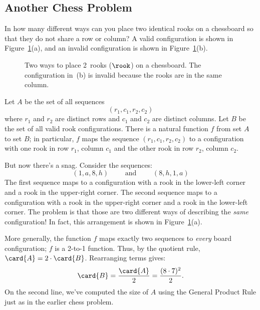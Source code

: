 \subsection{Another Chess Problem}

In how many different ways can you place two identical rooks on a
chessboard so that they do not share a row or column?  A valid
configuration is shown in Figure~\ref{fig:11Q8}(a), and an invalid
configuration is shown in Figure~\ref{fig:11Q8}(b).

\begin{figure}\normalbaselines

\subfloat[valid]{\chessboard[setpieces={ra1, rh8}]}
\subfloat[invalid]{\chessboard[setpieces={rd1, rd6}]}

\caption{Two ways to place 2~rooks ($\rook$) on a chessboard.  The
  configuration in~(b) is invalid because the rooks are in the same
  column.}

\label{fig:11Q8}

\end{figure}

Let $A$ be the set of all sequences
%
\[
(r_1, c_1, r_2, c_2)
\]
%
where $r_1$ and $r_2$ are distinct rows and $c_1$ and $c_2$ are
distinct columns.  Let $B$ be the set of all valid rook
configurations.  There is a natural function $f$ from set $A$ to set
$B$; in particular, $f$ maps the sequence $(r_1, c_1, r_2, c_2)$ to a
configuration with one rook in row $r_1$, column $c_1$ and the other
rook in row $r_2$, column $c_2$.

But now there's a snag.  Consider the sequences:
%
\[
(1, a, 8, h) \qquad \text{ and } \qquad (8, h, 1, a)
\]
%
The first sequence maps to a configuration with a rook in the
lower-left corner and a rook in the upper-right corner.  The second
sequence maps to a configuration with a rook in the upper-right corner
and a rook in the lower-left corner.  The problem is that those are
two different ways of describing the \emph{same} configuration!  In
fact, this arrangement is shown in Figure~\ref{fig:11Q8}(a).

More generally, the function $f$ maps exactly two sequences to
\emph{every} board configuration; $f$ is a 2-to-1 function.
Thus, by the quotient rule, $\card{A} = 2 \cdot \card{B}$.
Rearranging terms gives:
%
\begin{align*}
\card{B}
     = \frac{\card{A}}{2} %
     = \frac{(8 \cdot 7)^2}{2}.
\end{align*}
%
On the second line, we've computed the size of $A$ using the General
Product Rule just as in the earlier chess problem.

